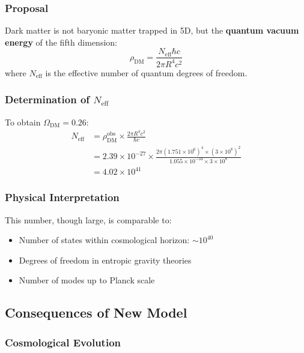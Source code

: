 \documentclass[12pt,a4paper]{article}
\begin{document}
\subsubsection{Proposal}

Dark matter is not baryonic matter trapped in 5D, but the \textbf{quantum vacuum energy} of the fifth dimension:
\begin{equation}
\rho_\mathrm{DM} = \frac{N_\mathrm{eff} \hbar c}{2\pi R^4 c^2}
\end{equation}
where $N_\mathrm{eff}$ is the effective number of quantum degrees of freedom.

\subsubsection{Determination of $N_\mathrm{eff}$}

To obtain $\Omega_\mathrm{DM} = 0.26$:
\begin{align}
N_\mathrm{eff} &= \rho_\mathrm{DM}^\mathrm{obs} \times \frac{2\pi R^4 c^2}{\hbar c} \\
&= 2.39 \times 10^{-27} \times \frac{2\pi (1.751 \times 10^6)^4 \times (3 \times 10^8)^2}{1.055 \times 10^{-34} \times 3 \times 10^8} \\
&= 4.02 \times 10^{41}
\end{align}

\subsubsection{Physical Interpretation}

This number, though large, is comparable to:
\begin{itemize}
    \item Number of states within cosmological horizon: $\sim 10^{40}$
    \item Degrees of freedom in entropic gravity theories
    \item Number of modes up to Planck scale
\end{itemize}

\subsection{Consequences of New Model}

\subsubsection{Cosmological Evolution}
\end{document}
